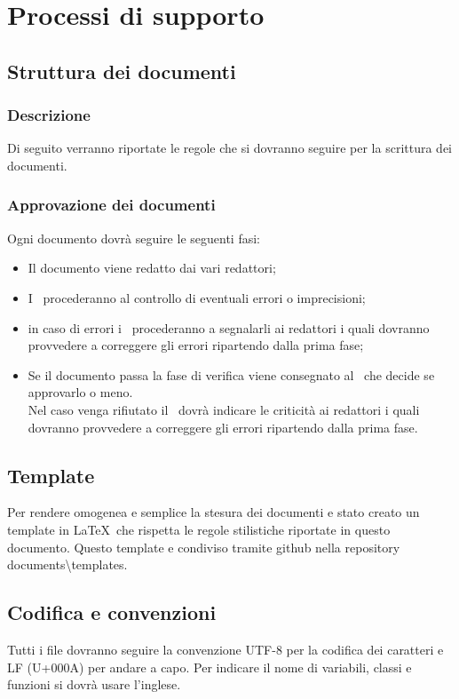 \documentclass[../NormeDiProgetto.tex]{subfiles}
\begin{document}
	\section{Processi di supporto}
		
		
		\subsection{Struttura dei documenti}
		\subsubsection{Descrizione}
		Di seguito verranno riportate le regole che si dovranno seguire per la scrittura dei documenti. 
		
		\subsubsection{Approvazione dei documenti}
		Ogni documento dovrà seguire le seguenti fasi:
		\begin{itemize}
			\item Il documento viene redatto dai vari redattori;
			\item I \verificatore\  procederanno al controllo di eventuali errori o imprecisioni;
			\item in caso di errori i \verificatore\ procederanno a segnalarli ai redattori i quali dovranno provvedere a correggere gli errori ripartendo dalla prima fase;
			\item Se il documento passa la fase di verifica viene consegnato al \responsabilediprogetto\ che decide se approvarlo o meno.\\
			Nel caso venga rifiutato il \responsabilediprogetto\ dovrà indicare le criticità ai redattori i quali dovranno provvedere a correggere gli errori ripartendo dalla prima fase.
			
		\end{itemize} 
		\subsection{Template}
		Per rendere omogenea e semplice la stesura dei documenti e stato creato un template in \LaTeX\ che rispetta le regole stilistiche riportate in questo documento. Questo template e condiviso tramite github nella repository  documents\textbackslash templates.
		\subsection{Codifica e convenzioni}
		Tutti i file dovranno seguire la convenzione \gl UTF-8  per la codifica dei caratteri e \gl LF (U+000A) per andare a capo.
		Per indicare il nome di variabili, classi e funzioni si dovrà usare l'inglese.
		
\end{document}
